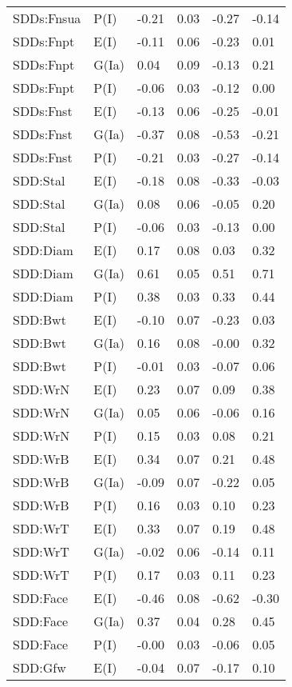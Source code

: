 \begin{center}
\begin{longtable}{|p{1.1in}|p{0.7in}|p{0.7in}|p{0.6in}|p{0.6in}|p{0.6in}|}
  SDDs:Fnsua & P(I) & -0.21 & 0.03 & -0.27 & -0.14 \\ 
  SDDs:Fnpt & E(I) & -0.11 & 0.06 & -0.23 & 0.01 \\ 
  SDDs:Fnpt & G(Ia) & 0.04 & 0.09 & -0.13 & 0.21 \\ 
  SDDs:Fnpt & P(I) & -0.06 & 0.03 & -0.12 & 0.00 \\ 
  SDDs:Fnst & E(I) & -0.13 & 0.06 & -0.25 & -0.01 \\ 
  SDDs:Fnst & G(Ia) & -0.37 & 0.08 & -0.53 & -0.21 \\ 
  SDDs:Fnst & P(I) & -0.21 & 0.03 & -0.27 & -0.14 \\ 
  SDD:Stal & E(I) & -0.18 & 0.08 & -0.33 & -0.03 \\ 
  SDD:Stal & G(Ia) & 0.08 & 0.06 & -0.05 & 0.20 \\ 
  SDD:Stal & P(I) & -0.06 & 0.03 & -0.13 & 0.00 \\ 
  SDD:Diam & E(I) & 0.17 & 0.08 & 0.03 & 0.32 \\ 
  SDD:Diam & G(Ia) & 0.61 & 0.05 & 0.51 & 0.71 \\ 
  SDD:Diam & P(I) & 0.38 & 0.03 & 0.33 & 0.44 \\ 
  SDD:Bwt & E(I) & -0.10 & 0.07 & -0.23 & 0.03 \\ 
  SDD:Bwt & G(Ia) & 0.16 & 0.08 & -0.00 & 0.32 \\ 
  SDD:Bwt & P(I) & -0.01 & 0.03 & -0.07 & 0.06 \\ 
  SDD:WrN & E(I) & 0.23 & 0.07 & 0.09 & 0.38 \\ 
  SDD:WrN & G(Ia) & 0.05 & 0.06 & -0.06 & 0.16 \\ 
  SDD:WrN & P(I) & 0.15 & 0.03 & 0.08 & 0.21 \\ 
  SDD:WrB & E(I) & 0.34 & 0.07 & 0.21 & 0.48 \\ 
  SDD:WrB & G(Ia) & -0.09 & 0.07 & -0.22 & 0.05 \\ 
  SDD:WrB & P(I) & 0.16 & 0.03 & 0.10 & 0.23 \\ 
  SDD:WrT & E(I) & 0.33 & 0.07 & 0.19 & 0.48 \\ 
  SDD:WrT & G(Ia) & -0.02 & 0.06 & -0.14 & 0.11 \\ 
  SDD:WrT & P(I) & 0.17 & 0.03 & 0.11 & 0.23 \\ 
  SDD:Face & E(I) & -0.46 & 0.08 & -0.62 & -0.30 \\ 
  SDD:Face & G(Ia) & 0.37 & 0.04 & 0.28 & 0.45 \\ 
  SDD:Face & P(I) & -0.00 & 0.03 & -0.06 & 0.05 \\ 
  SDD:Gfw & E(I) & -0.04 & 0.07 & -0.17 & 0.10 \\ 

\end{longtable}
\end{center}
